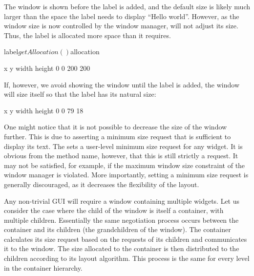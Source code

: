 %
The window is shown before the label is added, and the default size is
likely much larger than the space the label needs to display ``Hello
world''. However, as the window size is now controlled by the window
manager,  will not adjust its size. Thus, the label
is allocated more space than it requires.
\begin{Schunk}
\begin{Sinput}
 label$getAllocation()$allocation
\end{Sinput}
\end{Schunk}
\begin{Soutput}
     x      y  width height 
     0      0    200    200 
\end{Soutput}
%
If, however, we avoid showing the window until the label is added, the
window will size itself so that the label has its natural size:
\begin{Schunk}
\end{Schunk}
\begin{Schunk}
\begin{Soutput}
     x      y  width height 
     0      0     79     18 
\end{Soutput}
\end{Schunk}
%
One might notice that it is not possible to decrease the size of the
window further. This is due to  asserting a minimum
size request that is sufficient to display its text. The
 sets a user-level minimum size 
request for any widget. It is obvious from the method name, however,
that this is still strictly a request. It may not be satisfied, for
example, if the maximum window size constraint of the window manager
is violated. More importantly, setting a minimum size request is
generally discouraged, as it decreases the flexibility of the layout.

Any non-trivial GUI will require a window containing multiple
widgets. Let us consider the case where the child of the window is
itself a container, with multiple children.  Essentially the same
negotiation process occurs between the container and its children (the
grandchildren of the window). The container calculates its size
request based on the requests of its children and communicates it to
the window. The size allocated to the container is then distributed to
the children according to its layout algorithm. This process is the
same for every level in the container hierarchy.

